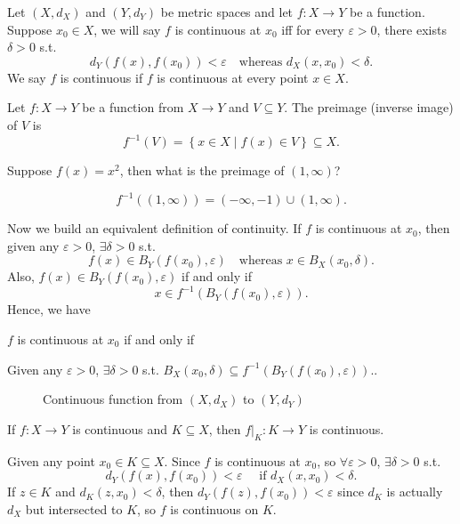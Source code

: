 \begin{definition} \label{def: continuous}
    Let \((X, d_X)\) and \((Y, d_Y)\) be metric spaces and let \(f: X \to Y\) be a function. Suppose \(x_0 \in X\), we will say \(f\) is continuous at \(x_0\) iff for every \(\varepsilon > 0\), there exists \(\delta > 0\) s.t. 
    \[
        d_Y(f(x), f(x_0)) < \varepsilon \quad \text{whereas } d_X(x, x_0) < \delta.
    \] We say \(f\) is continuous if \(f\) is continuous at every point \(x \in X\).     
\end{definition}

\begin{definition}[Preimage] \label{def: preimage}
    Let \(f : X \to Y\) be a function from \(X \to Y\) and \(V \subseteq Y\). The preimage (inverse image) of \(V\) is 
    \[
        f^{-1}(V) = \left\{ x\in X \mid f(x) \in V \right\} \subseteq X.
    \]    
\end{definition}

\begin{eg}
    Suppose \(f(x) = x^2\), then what is the preimage of \((1, \infty )\)?  
\end{eg}
\begin{answer}
    \[
        f^{-1}((1, \infty )) = (-\infty , -1) \cup (1, \infty ).
    \]
\end{answer}
Now we build an equivalent definition of continuity. If \(f\) is continuous at \(x_0\), then given any \(\varepsilon > 0\), \(\exists \delta > 0\) s.t. 
\[
    f(x) \in B_Y(f(x_0), \varepsilon ) \quad \text{whereas } x \in B_X(x_0, \delta ).
\]  Also, \(f(x) \in B_Y(f(x_0), \varepsilon )\) if and only if
\[
    x \in f^{-1}(B_Y(f(x_0), \varepsilon )).
\] Hence, we have 
\begin{corollary}
    \(f\) is continuous at \(x_0\) if and only if 
    \begin{center}
        Given any \(\varepsilon > 0\), \(\exists \delta > 0\) s.t. \(B_X(x_0, \delta ) \subseteq f^{-1}(B_Y(f(x_0), \varepsilon )).\).   
    \end{center}  
\end{corollary}
\begin{figure}[H]
    \centering
    \caption{Continuous function from \((X, d_X)\) to \((Y, d_Y)\)}
    \label{fig:conti}
\end{figure}
\begin{remark} \label{rmk: if f conti then f intersect K conti}
    If \(f: X \to Y\) is continuous and \(K \subseteq X\), then \(f\vert_K : K \to Y\) is continuous.   
\end{remark}
\begin{explanation}
    Given any point \(x_0 \in K \subseteq X\). Since \(f\) is continuous at \(x_0\), so \(\forall \varepsilon > 0\), \(\exists \delta > 0\) s.t. 
    \[
        d_Y\left( f(x), f(x_0) \right) < \varepsilon \quad \text{ if } d_X(x, x_0) < \delta. 
    \]     
    If \(z \in K\) and \(d_K(z, x_0) < \delta \), then \(d_Y(f(z), f(x_0)) <\varepsilon \) since \(d_K\) is actually \(d_X\) but intersected to \(K\), so \(f\) is continuous on \(K\).     
\end{explanation}

